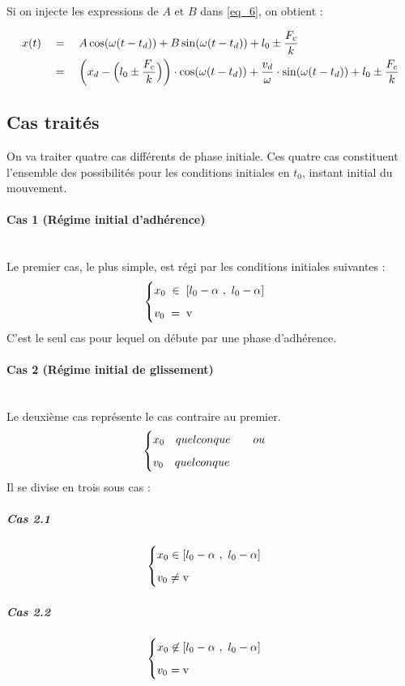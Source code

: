 \documentclass{article}
\begin{document}
Si on injecte les expressions de $A$ et $B$ dans \eqref{eq_6}, on obtient :

\begin{align}
	x(t) \quad&=\quad A\cos(\omega (t-t_d))+B\sin(\omega (t-t_d))+ l_0 \pm \dfrac{F_c}{k} \nonumber \\
	&= \quad\left(x_d - \Big{(}l_0 \pm \dfrac{F_c}{k}\Big{)}\right)\cdot\cos(\omega (t-t_d)) +\dfrac{v_d}{\omega}\cdot\sin(\omega (t-t_d)) + l_0 \pm \dfrac{F_c}{k}\addtocounter{equation}{2} \label{eq_7}
\end{align}

\subsection{Cas traités}\label{ssec_1.2}
On va traiter quatre cas différents de phase initiale. Ces quatre cas constituent l'ensemble des possibilités pour les conditions initiales en $t_0$, instant initial du mouvement.  
\paragraph{Cas 1 (Régime initial d'adhérence)}\label{par_1.2.0.1}
\mbox{}\\
Le premier cas, le plus simple, est régi par les conditions initiales suivantes :
$$
\begin{cases}
	\vspace{.2cm}
	x_0\;\in\; [l_0-\alpha~,~l_0-\alpha]\\
	v_0 \;=\; \text{v}
\end{cases}
$$
C'est le seul cas pour lequel on débute par une phase d'adhérence. 

\paragraph{Cas 2 (Régime initial de glissement)}\label{par_1.2.0.2}
\mbox{}\\
Le deuxième cas représente le cas contraire au premier.$$
\begin{cases}
	\vspace{.2cm}
	x_0 \quad\text\small{quelconque}\qquad \text\small{ou}\\
	v_0 \quad\text\small{quelconque}
\end{cases}
$$
Il se divise en trois sous cas :
\subparagraph{Cas 2.1} \label{spar_1.2.0.2.1}
$$
\begin{cases}
	\vspace{.2cm}
	x_0  \in [l_0-\alpha~,~l_0-\alpha]\\
	v_0 \neq \text{v}
\end{cases}
$$
\subparagraph{Cas 2.2} \label{spar_1.2.0.2.2}
$$
\begin{cases}
	\vspace{.2cm}
	x_0  \not\in [l_0-\alpha~,~l_0-\alpha]\\
	v_0 = \text{v}
\end{cases}
$$
\end{document}
